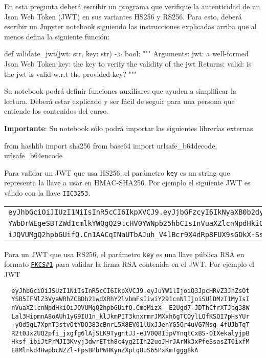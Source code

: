 
En esta pregunta deberá escribir un programa que verifique la autenticidad de un Json Web Token (JWT) en sus variantes HS256 y RS256. Para esto, deberá escribir un Jupyter notebook siguiendo las instrucciones explicadas arriba que al menos defina la siguiente función:

\begin{python}
def validate_jwt(jwt: str, key: str) -> bool:
    """
    Arguments:
      jwt: a well-formed Json Web Token
      key: the key to verify the validity of the jwt
    Returns:
      valid: is the jwt is valid w.r.t the provided key?
    """
\end{python}
Su notebook podrá definir funciones auxiliares que ayuden a simplificar la lectura. Deberá estar explicado y ser fácil de seguir para una persona que entiende los contenidos del curso.

\textbf{Importante}: Su notebook sólo podrá importar las siguientes librerías externas
\begin{python}
from hashlib import sha256
from base64 import urlsafe_b64decode, urlsafe_b64encode
\end{python}


Para validar un JWT que usa HS256, el parámetro \texttt{key} es un string que representa la llave a usar en HMAC-SHA256. Por ejemplo el siguiente JWT es válido con la llave \texttt{IIC3253}.

\begin{tabular}{l}
  \texttt{eyJhbGciOiJIUzI1NiIsInR5cCI6IkpXVCJ9.eyJjbGFzcyI6IkNyaXB0b2dy}\\
  \texttt{YWbDrWEgeSBTZWd1cmlkYWQgQ29tcHV0YWNpb25hbCIsInVuaXZlcnNpdHkiO}\\
  \texttt{iJQVUMgQ2hpbGUifQ.Cn1AACqINaUTbAJuh\_V4lBcr9X4dRp8FUX9sGDkX-Ss}
\end{tabular}

Para un JWT que usa RS256, el parámetro \texttt{key} es una llave pública RSA en formato \href{https://www.rfc-editor.org/rfc/rfc8017}{\texttt{PKCS\#1}} para validar la firma RSA contenida en el JWT. Por ejemplo el JWT

\begin{verbatim}
  eyJhbGciOiJSUzI1NiIsInR5cCI6IkpXVCJ9.eyJuYW1lIjoiQ3JpcHRvZ3JhZsOt
  YSB5IFNlZ3VyaWRhZCBDb21wdXRhY2lvbmFsIiwiY291cnNlIjoiSUlDMzI1MyIsI
  nVuaXZlcnNpdHkiOiJQVUMgQ2hpbGUifQ.CmoMizX-_E2Ugd7-JDThCfrXTJbg38W
  Lal3HipmnA8oAUh1yG9IU1n_klJkmPIT3knxrmrJMXxh6gTCOylLQfKSQI7pHsYUr
  -yOd5gL7XpnT3stvOtYDO383cBnrL5X8EV01lUxJJenYG5Qr4uVG7Msg-4fUJbTqT
  R2t0Jx2UQ2pfi_jxgfg6lAjSLK9TygntJJ-eJV0Q8IipVYnqtCxBS-OIXekalyjpB
  Hksf_ibiJtPrMJI3Kvyj3dwrETth8c4yg2IIh22uoJHrJArNk3xPfeSsasZT0ixfM
  E8Mlnkd4HwpbcNZZl-FpsBPbPWHKynZXptq8uS65PxKmTggg8kA
\end{verbatim}

